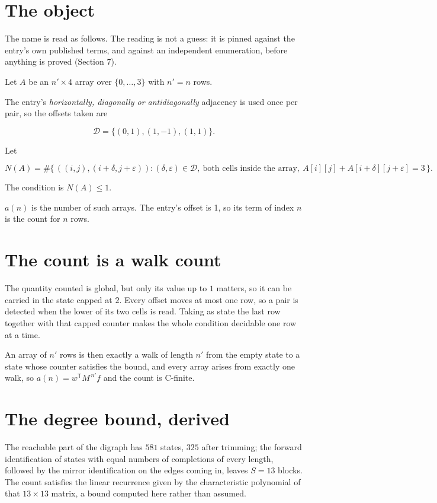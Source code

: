 \documentclass[11pt]{article}
\theoremstyle{definition}
\begin{document}
\section{The object}

The name is read as follows. The reading is not a guess: it is pinned against the entry's own published terms, and against an independent enumeration, before anything is proved (Section 7).

Let $A$ be an $n' \times 4$ array over $\{0,\dots,3\}$ with $n' = n$ rows.

The entry's {\itshape horizontally, diagonally or antidiagonally} adjacency is used once per pair, so the offsets taken are

\[\mathcal{D} = \{(0,1), (1,-1), (1,1)\}.\]

Let

\[N(A) = \#\bigl\{\,((i,j),(i{+}\delta,j{+}\varepsilon)) : (\delta,\varepsilon) \in \mathcal{D},\ \text{both cells inside the array},\ A[i][j] + A[i{+}\delta][j{+}\varepsilon] = 3\,\bigr\}.\]

The condition is $N(A) \le 1$.

$a(n)$ is the number of such arrays. The entry's offset is 1, so its term of index $n$ is the count for $n$ rows.

\section{The count is a walk count}

The quantity counted is global, but only its value up to $1$ matters, so it can be carried in the state capped at $2$. Every offset moves at most one row, so a pair is detected when the lower of its two cells is read. Taking as state the last row together with that capped counter makes the whole condition decidable one row at a time.

An array of $n'$ rows is then exactly a walk of length $n'$ from the empty state to a state whose counter satisfies the bound, and every array arises from exactly one walk, so $a(n) = w^{\mathsf T}M^{\,n'}f$ and the count is C-finite.

\section{The degree bound, derived}

The reachable part of the digraph has $581$ states, $325$ after trimming; the forward identification of states with equal numbers of completions of every length, followed by the mirror identification on the edges coming in, leaves $S = 13$ blocks. The count satisfies the linear recurrence given by the characteristic polynomial of that $13\times13$ matrix, a bound computed here rather than assumed.
\end{document}
